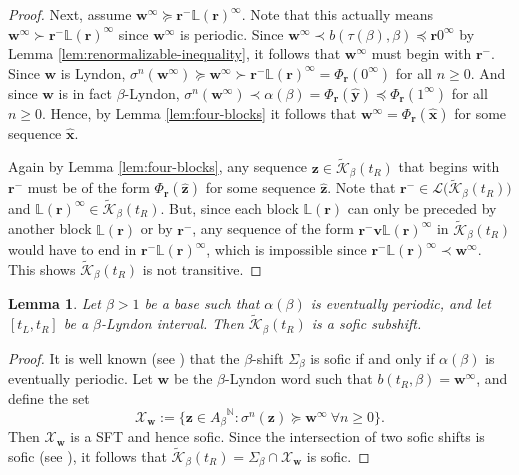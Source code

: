 \documentclass[11pt]{amsart}
\newtheorem{lemma}[theorem]{Lemma}
\theoremstyle{definition}
\theoremstyle{remark}
\numberwithin{equation}{section}
\newcommand{\N}{\ensuremath{\mathbb{N}}}
\renewcommand{\L}{\ensuremath{\mathbb{L}}}
\newcommand{\Kt}{\widetilde{\mathcal{K}}}
\renewcommand{\r}{ {\mathbf{r}}}
\newcommand{\cL}{\mathcal{L}}
\renewcommand{\v}{\mathbf{v}}
\newcommand{\w}{\mathbf{w}}
\newcommand{\y}{\mathbf{y}}
\newcommand{\z}{\mathbf{z}}
\newcommand{\f}{\infty}
\newcommand{\al}{\alpha}
\newcommand{\lle}{\preccurlyeq}
\newcommand{\lge}{\succcurlyeq}
\newcommand{\si}{\sigma}
\begin{document}
\begin{proof}
Next, assume $\w^\f\lge \r^-\L(\r)^\f$. Note that this actually means $\w^\f\succ \r^-\L(\r)^\f$ since $\w^\f$ is periodic. %
Since {$\w^\f\prec b(\tau(\beta),\beta)\lle \r0^\f$ by Lemma \ref{lem:renormalizable-inequality}, it follows that $\w^\f$ must} begin with $\r^-$. {Since $\w$ is Lyndon, $\si^n(\w^\f)\lge \w^\f\succ \r^-\L(\r)^\f=\Phi_\r(0^\f)$ for all $n\geq 0$. And since $\w$ is in fact $\beta$-Lyndon, $\si^n(\w^\f)\prec\al(\beta)=\Phi_\r(\hat{\y})\lle \Phi_\r(1^\f)$ for all $n\geq 0$. Hence,} by Lemma \ref{lem:four-blocks} it follows that $\w^\f=\Phi_\r(\hat{\mathbf{x}})$ for some sequence $\hat{\mathbf{x}}$.


Again by Lemma \ref{lem:four-blocks}, any sequence $\z\in\Kt_\beta(t_R)$ that begins with $\r^-$ must be of the form $\Phi_\r(\hat{\z})$ for some sequence $\hat{\z}$. Note that $\r^-\in\cL\big(\Kt_\beta(t_R)\big)$ and $\L(\r)^\f\in\Kt_\beta(t_R)$. But, since each block $\L(\r)$ can only be preceded by another block $\L(\r)$ or by $\r^-$, any sequence of the form $\r^-\v\L(\r)^\f$ in $\Kt_\beta(t_R)$ would have to end in $\r^-\L(\r)^\f$, which is impossible since $\r^-\L(\r)^\f\prec\w^\f$. This shows $\Kt_\beta(t_R)$ is not transitive.
\end{proof}

\begin{lemma} \label{lem:sofic-subshift}
Let $\beta{>1}$ be a base such that $\alpha(\beta)$ is eventually periodic, and let $[t_L,t_R]$ be a $\beta$-Lyndon interval. Then $\Kt_\beta(t_R)$ is a sofic subshift.
\end{lemma}

\begin{proof}
It is well known (see \cite{Blanchard-1989}) that the $\beta$-shift $\Sigma_\beta$ is sofic if and only if $\alpha(\beta)$ is eventually periodic. Let $\w$ be the $\beta$-Lyndon word such that $b(t_R,\beta)=\w^\f$, and define the set
\[
\mathcal{X}_\w:=\{\z\in{A_\beta}^\N: \sigma^n(\z)\lge \w^\f\ \forall n\geq 0\}.
\]
Then $\mathcal{X}_\w$ is a SFT and hence sofic. Since the intersection of two sofic shifts is sofic (see \cite[Proposition 3.4.10]{Lind_Marcus_1995}), it follows that $\Kt_\beta(t_R)=\Sigma_\beta\cap \mathcal{X}_\w$ is sofic.
\end{proof}
\end{document}
